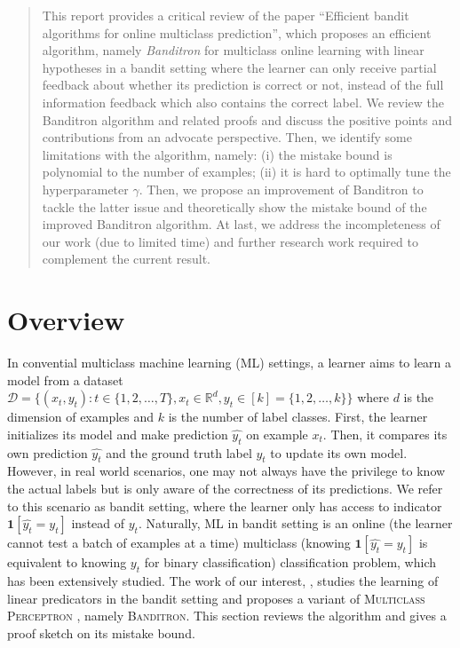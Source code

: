 \documentclass{article}
\begin{document}
\begin{abstract}
    This report provides a critical review of the paper ``Efficient bandit algorithms for online multiclass prediction''\cite{kakade2008efficient}, which proposes an efficient algorithm, namely \textit{Banditron} for multiclass online learning with linear hypotheses in a bandit setting where the learner can only receive partial feedback about whether its prediction is correct or not, instead of the full information feedback which also contains the correct label. We review the Banditron algorithm and related proofs and discuss the positive points and contributions from an advocate perspective. Then, we identify some limitations with the algorithm, namely: (i) the mistake bound is polynomial to the number of examples; (ii) it is hard to optimally tune the hyperparameter $\gamma$. Then, we propose an improvement of Banditron to tackle the latter issue and theoretically show the mistake bound of the improved Banditron algorithm. At last, we address the incompleteness of our work (due to limited time) and further research work required to complement the current result.
\end{abstract}

\section{Overview}
\vspace{-.05in}

In convential multiclass machine learning (ML) settings, a learner aims to learn a model from a dataset $\mathcal{D}=\{(x_t,y_t):t\in\{1,2,\ldots,T\},x_t\in\mathbb{R}^d,y_t\in[k]=\{1,2,\ldots,k\}\}$ where $d$ is the dimension of examples and $k$ is the number of label classes. First, the learner initializes its model and make prediction $\hat{y_t}$ on example $x_t$. Then, it compares its own prediction $\hat{y_t}$ and the ground truth label $y_t$ to update its own model. However, in real world scenarios, one may not always have the privilege to know the actual labels but is only aware of the correctness of its predictions. We refer to this scenario as bandit setting, where the learner only has access to indicator $\mathbf{1}[\hat{y_t}=y_t]$ instead of $y_t$. Naturally, ML in bandit setting is an online (the learner cannot test a batch of examples at a time) multiclass (knowing $\mathbf{1}[\hat{y_t}=y_t]$ is equivalent to knowing $y_t$ for binary classification) classification problem, which has been extensively studied. The work of our interest, \citet{kakade2008efficient}, studies the learning of linear predicators in the bandit setting and proposes a variant of \textsc{Multiclass Perceptron} \cite{crammer2003ultraconservative}, namely \textsc{Banditron}. This section reviews the algorithm and gives a proof sketch on its mistake bound.
    
\end{document}
